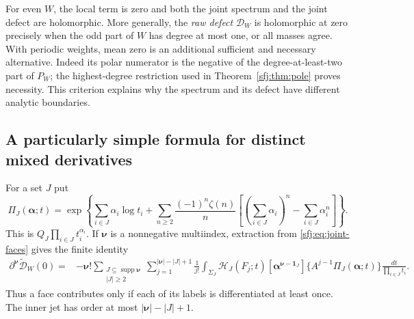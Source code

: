 For even $W$, the local term is zero and both the joint spectrum and
the joint defect are holomorphic.  More generally, the \emph{raw
defect} $\mathscr D_W$ is holomorphic at zero precisely when the odd
part of $W$ has degree at most one, or all masses agree.  With periodic
weights, mean zero is an additional sufficient and necessary alternative.
Indeed its polar numerator is the negative of the degree-at-least-two
part of $P_W$; the highest-degree restriction used in
Theorem~\ref{sfj:thm:pole} proves necessity.  This criterion explains
why the spectrum and its defect have different analytic boundaries.

\subsection{A particularly simple formula for distinct mixed derivatives}

For a set $J$ put
\[
 \Pi_J(\boldsymbol\alpha;t)=
 \exp\left\{\sum_{i\in J}\alpha_i\log t_i+
  \sum_{n\ge2}\frac{(-1)^n\zeta(n)}n
    \left[\left(\sum_{i\in J}\alpha_i\right)^n-
                             \sum_{i\in J}\alpha_i^n\right]\right\}.
\]
This is $Q_J\prod_{i\in J}t_i^{\alpha_i}$.  If $\boldsymbol\nu$
is a nonnegative multiindex, extraction from
\eqref{sfj:eq:joint-faces} gives the finite identity
\begin{align}\label{sfj:eq:all-mixed}
 \partial^{\boldsymbol\nu}\widetilde{\mathscr D}_W(0)
 ={}&-\boldsymbol\nu!\!
 \sum_{\substack{J\subseteq\operatorname{supp}\boldsymbol\nu\\|J|\ge2}}
 \sum_{j=1}^{|\boldsymbol\nu|-|J|+1}\frac1{j!}
 \int_{\Sigma_J}\mathcal H_J(F_j;t)
       [\boldsymbol\alpha^{\boldsymbol\nu-\boldsymbol1_J}]
        \{A^{j-1}\Pi_J(\boldsymbol\alpha;t)\}
                          \frac{dt}{\prod_{i\in J}t_i}.
\end{align}
Thus a face contributes only if each of its labels is differentiated
at least once.  The inner jet has order at most
$|\boldsymbol\nu|-|J|+1$.

